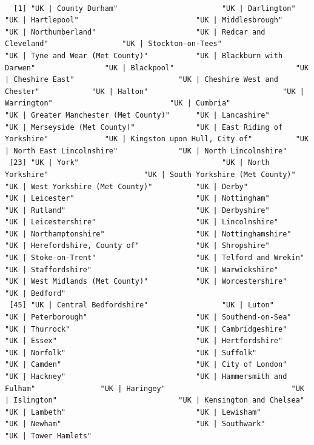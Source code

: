 \documentclass[11pt]{article}
\begin{document}
\begin{verbatim}

  [1] "UK | County Durham"                        "UK | Darlington"                           "UK | Hartlepool"                           "UK | Middlesbrough"                        "UK | Northumberland"                       "UK | Redcar and Cleveland"                 "UK | Stockton-on-Tees"                     "UK | Tyne and Wear (Met County)"           "UK | Blackburn with Darwen"                "UK | Blackpool"                            "UK | Cheshire East"                        "UK | Cheshire West and Chester"            "UK | Halton"                               "UK | Warrington"                           "UK | Cumbria"                              "UK | Greater Manchester (Met County)"      "UK | Lancashire"                           "UK | Merseyside (Met County)"              "UK | East Riding of Yorkshire"             "UK | Kingston upon Hull, City of"          "UK | North East Lincolnshire"              "UK | North Lincolnshire"                  
 [23] "UK | York"                                 "UK | North Yorkshire"                      "UK | South Yorkshire (Met County)"         "UK | West Yorkshire (Met County)"          "UK | Derby"                                "UK | Leicester"                            "UK | Nottingham"                           "UK | Rutland"                              "UK | Derbyshire"                           "UK | Leicestershire"                       "UK | Lincolnshire"                         "UK | Northamptonshire"                     "UK | Nottinghamshire"                      "UK | Herefordshire, County of"             "UK | Shropshire"                           "UK | Stoke-on-Trent"                       "UK | Telford and Wrekin"                   "UK | Staffordshire"                        "UK | Warwickshire"                         "UK | West Midlands (Met County)"           "UK | Worcestershire"                       "UK | Bedford"                             
 [45] "UK | Central Bedfordshire"                 "UK | Luton"                                "UK | Peterborough"                         "UK | Southend-on-Sea"                      "UK | Thurrock"                             "UK | Cambridgeshire"                       "UK | Essex"                                "UK | Hertfordshire"                        "UK | Norfolk"                              "UK | Suffolk"                              "UK | Camden"                               "UK | City of London"                       "UK | Hackney"                              "UK | Hammersmith and Fulham"               "UK | Haringey"                             "UK | Islington"                            "UK | Kensington and Chelsea"               "UK | Lambeth"                              "UK | Lewisham"                             "UK | Newham"                               "UK | Southwark"                            "UK | Tower Hamlets"                       

\end{verbatim}
\end{document}
